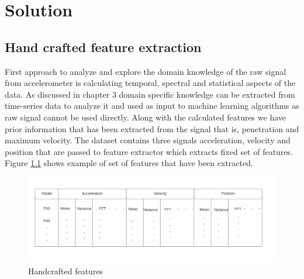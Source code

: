 

    \chapter{Solution}

   \section{Hand crafted feature extraction}  
   First approach to analyze and explore the domain knowledge of the raw signal from accelerometer is calculating temporal, spectral and statistical aspects of the data. As discussed in chapter 3 domain specific knowledge can be extracted from time-series data to analyze it and used as input to machine learning algorithms as raw signal cannot be used directly. Along with the calculated features we have prior information that has been extracted from the signal that is, penetration and maximum velocity. The dataset contains three signals acceleration, velocity and position that are passed to feature extractor which extracts fixed set of features. Figure \ref{n0} shows example of set of features that have been extracted.
   
   \begin{figure}[h]
   	\centering
   	\includegraphics[width=1\linewidth]{images/featable.png}
   	\caption{Handcrafted features }
   	\label{n0}
   \end{figure}
   
